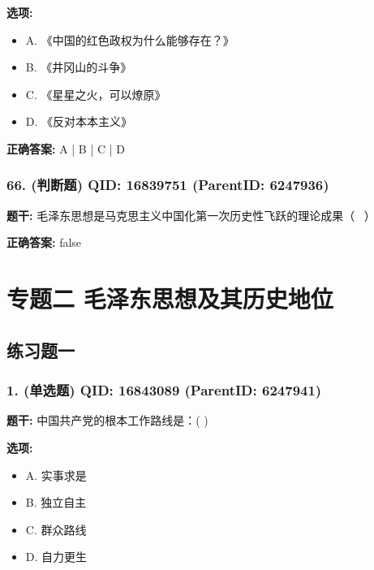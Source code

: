 \documentclass[12pt,UTF8]{ctexart}
\begin{document}
\textbf{选项:}
\begin{itemize}[leftmargin=*]

  \item A. 《中国的红色政权为什么能够存在？》

  \item B. 《井冈山的斗争》

  \item C. 《星星之火，可以燎原》

  \item D. 《反对本本主义》

\end{itemize}

\textbf{正确答案:}
A | B | C | D

\vspace{0.3em}\hrulefill\vspace{0.7em}

\subsubsection*{66. (判断题) \small QID: 16839751 (ParentID: 6247936)}

\textbf{题干:}
毛泽东思想是马克思主义中国化第一次历史性飞跃的理论成果（  ）



\textbf{正确答案:}
false

\vspace{0.3em}\hrulefill\vspace{0.7em}

\section*{专题二 毛泽东思想及其历史地位}
\hrulefill

\subsection*{练习题一}

\subsubsection*{1. (单选题) \small QID: 16843089 (ParentID: 6247941)}

\textbf{题干:}
中国共产党的根本工作路线是：( )



\textbf{选项:}
\begin{itemize}[leftmargin=*]

  \item A. 实事求是

  \item B. 独立自主

  \item C. 群众路线

  \item D. 自力更生

\end{itemize}
\end{document}
